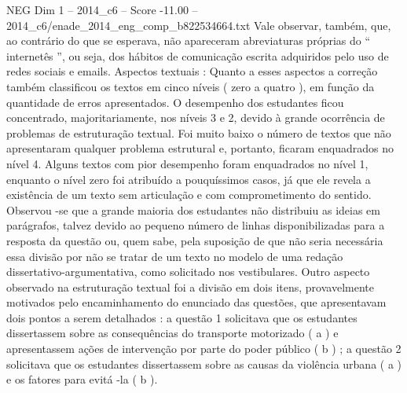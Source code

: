 \begin{textsample}{NEG Dim 1 – 2014\_c6 – Score -11.00 – 2014\_c6/enade\_2014\_eng\_comp\_b822534664.txt}
Vale observar, também, que, ao contrário do que se esperava, não apareceram abreviaturas próprias do “ internetês ”, ou seja, dos hábitos de comunicação escrita adquiridos pelo uso de redes sociais e emails.
Aspectos textuais : Quanto a esses aspectos a correção também classificou os textos em cinco níveis ( zero a quatro ), em função da quantidade de erros apresentados.
O desempenho dos estudantes ficou concentrado, majoritariamente, nos níveis 3 e 2, devido à grande ocorrência de problemas de estruturação textual.
Foi muito baixo o número de textos que não apresentaram qualquer problema estrutural e, portanto, ficaram enquadrados no nível 4.
Alguns textos com pior desempenho foram enquadrados no nível 1, enquanto o nível zero foi atribuído a pouquíssimos casos, já que ele revela a existência de um texto sem articulação e com comprometimento do sentido.
Observou -se que a grande maioria dos estudantes não distribuiu as ideias em parágrafos, talvez devido ao pequeno número de linhas disponibilizadas para a resposta da questão ou, quem sabe, pela suposição de que não seria necessária essa divisão por não se tratar de um texto no modelo de uma redação dissertativo-argumentativa, como solicitado nos vestibulares.
Outro aspecto observado na estruturação textual foi a divisão em dois itens, provavelmente motivados pelo encaminhamento do enunciado das questões, que apresentavam dois pontos a serem detalhados : a questão 1 solicitava que os estudantes dissertassem sobre as consequências do transporte motorizado ( a ) e apresentassem ações de intervenção por parte do poder público ( b ) ; a questão 2 solicitava que os estudantes dissertassem sobre as causas da violência urbana ( a ) e os fatores para evitá -la ( b ).

\end{textsample}
